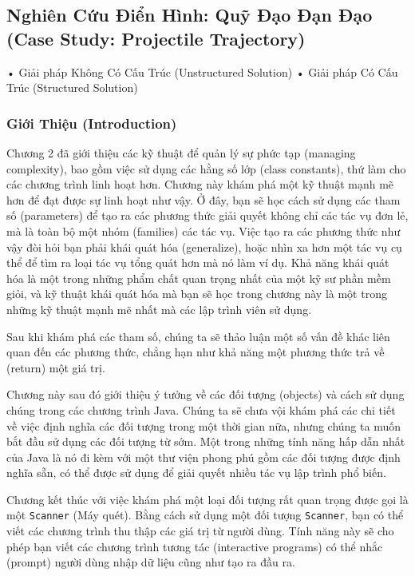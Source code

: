 \subsection{Nghiên Cứu Điển Hình: Quỹ Đạo Đạn Đạo (Case Study:
Projectile
Trajectory)}\label{nghiuxean-cux1ee9u-ux111iux1ec3n-huxecnh-quux1ef9-ux111ux1ea1o-ux111ux1ea1n-ux111ux1ea1o-case-study-projectile-trajectory}

• Giải pháp Không Có Cấu Trúc (Unstructured Solution) • Giải pháp Có Cấu
Trúc (Structured Solution)

\subsubsection{Giới Thiệu
(Introduction)}\label{giux1edbi-thiux1ec7u-introduction}

Chương 2 đã giới thiệu các kỹ thuật để quản lý sự phức tạp (managing
complexity), bao gồm việc sử dụng các hằng số lớp (class constants), thứ
làm cho các chương trình linh hoạt hơn. Chương này khám phá một kỹ thuật
mạnh mẽ hơn để đạt được sự linh hoạt như vậy. Ở đây, bạn sẽ học cách sử
dụng các tham số (parameters) để tạo ra các phương thức giải quyết không
chỉ các tác vụ đơn lẻ, mà là toàn bộ một nhóm (families) các tác vụ.
Việc tạo ra các phương thức như vậy đòi hỏi bạn phải khái quát hóa
(generalize), hoặc nhìn xa hơn một tác vụ cụ thể để tìm ra loại tác vụ
tổng quát hơn mà nó làm ví dụ. Khả năng khái quát hóa là một trong những
phẩm chất quan trọng nhất của một kỹ sư phần mềm giỏi, và kỹ thuật khái
quát hóa mà bạn sẽ học trong chương này là một trong những kỹ thuật mạnh
mẽ nhất mà các lập trình viên sử dụng.

Sau khi khám phá các tham số, chúng ta sẽ thảo luận một số vấn đề khác
liên quan đến các phương thức, chẳng hạn như khả năng một phương thức
trả về (return) một giá trị.

Chương này sau đó giới thiệu ý tưởng về các đối tượng (objects) và cách
sử dụng chúng trong các chương trình Java. Chúng ta sẽ chưa vội khám phá
các chi tiết về việc định nghĩa các đối tượng trong một thời gian nữa,
nhưng chúng ta muốn bắt đầu sử dụng các đối tượng từ sớm. Một trong
những tính năng hấp dẫn nhất của Java là nó đi kèm với một thư viện
phong phú gồm các đối tượng được định nghĩa sẵn, có thể được sử dụng để
giải quyết nhiều tác vụ lập trình phổ biến.

Chương kết thúc với việc khám phá một loại đối tượng rất quan trọng được
gọi là một \texttt{Scanner} (Máy quét). Bằng cách sử dụng một đối tượng
\texttt{Scanner}, bạn có thể viết các chương trình thu thập các giá trị
từ người dùng. Tính năng này sẽ cho phép bạn viết các chương trình tương
tác (interactive programs) có thể nhắc (prompt) người dùng nhập dữ liệu
cũng như tạo ra đầu ra.

